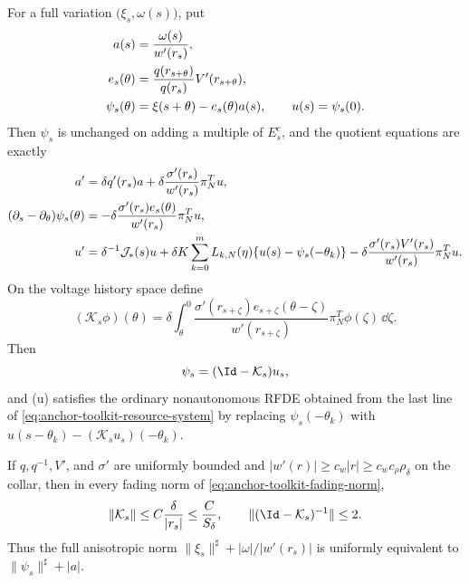 \begin{proposition}
For a full variation \(\bigl(\xi_s,\omega(s)\bigr)\), put
\begin{align}
 a(s)&=\frac{\omega(s)}{w'(r_s)},\notag\\
 e_s(\theta)&=\frac{q(r_{s+\theta})}{q(r_s)}V'(r_{s+\theta}),\notag\\
 \psi_s(\theta)&=\xi(s+\theta)-e_s(\theta)a(s),
 \qquad u(s)=\psi_s(0).
 \label{eq:anchor-toolkit-resource-coordinates}
\end{align}
Then \(\psi_s\) is unchanged on adding a multiple of \(E_s^c\), and the
quotient equations are exactly
\begin{align}
 a'&=\delta q'(r_s)a
       +\delta\frac{\sigma'(r_s)}{w'(r_s)}\pi_N^Tu,\notag\\
 (\partial_s-\partial_\theta)\psi_s(\theta)
 &=-\delta\frac{\sigma'(r_s)e_s(\theta)}{w'(r_s)}
       \pi_N^Tu,\notag\\
 u'&=\delta^{-1}\mathcal J_*(s)u
 +\delta K\sum_{k=0}^mL_{k,N}(\eta)
       \{u(s)-\psi_s(-\theta_k)\}
 -\delta\frac{\sigma'(r_s)V'(r_s)}{w'(r_s)}\pi_N^Tu.
 \label{eq:anchor-toolkit-resource-system}
\end{align}
On the voltage history space define
\begin{equation}
 (\mathcal K_s\phi)(\theta)=\delta\int_\theta^0
 \frac{\sigma'(r_{s+\zeta})
       e_{s+\zeta}(\theta-\zeta)}{w'(r_{s+\zeta})}
       \pi_N^T\phi(\zeta)\,\dd\zeta.
 \label{eq:anchor-toolkit-volterra-operator}
\end{equation}
Then
\begin{equation}
 \psi_s=(\Id-\mathcal K_s)u_s,
 \label{eq:anchor-toolkit-history-conjugacy}
\end{equation}
and (u) satisfies the ordinary nonautonomous RFDE obtained from the last
line of \cref{eq:anchor-toolkit-resource-system} by replacing
\(\psi_s(-\theta_k)\) with
\(u(s-\theta_k)-(\mathcal K_su_s)(-\theta_k)\).

If \(q,q^{-1},V'\), and \(\sigma'\) are uniformly bounded and
\(|w'(r)|\ge c_w|r|\ge c_w c_\rho\rho_\delta\) on the collar, then in every
fading norm of \cref{eq:anchor-toolkit-fading-norm},
\begin{equation}
 \|\mathcal K_s\|\le C\frac\delta{|r_s|}
       \le\frac C{S_\delta},\qquad
 \|(\Id-\mathcal K_s)^{-1}\|\le2.
 \label{eq:anchor-toolkit-volterra-bounds}
\end{equation}
Thus the full anisotropic norm
\(\|\xi_s\|^\sharp+|\omega|/|w'(r_s)|\) is uniformly equivalent to
\(\|\psi_s\|^\sharp+|a|\).
\end{proposition}

